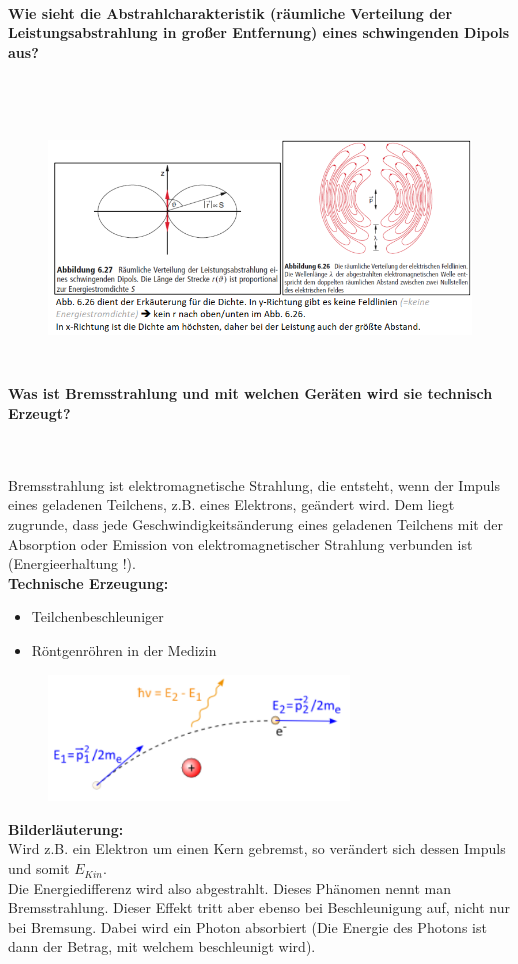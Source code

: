 \documentclass[a4paper, 11pt, ngerman, parskip=half-]{scrartcl}
\begin{document}
\paragraph{Wie sieht die Abstrahlcharakteristik (räumliche Verteilung der Leistungsabstrahlung in
    großer Entfernung) eines schwingenden Dipols aus?} ~
\begin{figure}[H]
    \centering
    \includegraphics[height=6.5cm]{image/12/5.png}
\end{figure}


\paragraph{Was ist Bremsstrahlung und mit welchen Geräten wird sie technisch Erzeugt?} ~

Bremsstrahlung ist elektromagnetische Strahlung, die entsteht, wenn der Impuls eines geladenen Teilchens, z.B. eines Elektrons, geändert wird. Dem liegt zugrunde, dass jede Geschwindigkeitsänderung eines geladenen Teilchens mit der Absorption oder Emission von elektromagnetischer Strahlung verbunden ist (Energieerhaltung !).\\
\textbf{Technische Erzeugung:} \\
\begin{itemize}
    \item Teilchenbeschleuniger
    \item Röntgenröhren in der Medizin
\end{itemize}
\begin{figure}[H]
    \centering
    \includegraphics[width=8cm]{image/12/6.png}
\end{figure}
\textbf{Bilderläuterung:} \\
Wird z.B. ein Elektron um einen Kern gebremst, so verändert sich dessen Impuls und somit $E_{Kin}$. \\
Die Energiedifferenz wird also abgestrahlt. Dieses Phänomen nennt man Bremsstrahlung. Dieser Effekt tritt aber ebenso bei Beschleunigung auf, nicht nur bei Bremsung. Dabei wird ein Photon absorbiert (Die Energie des Photons ist dann der Betrag, mit welchem beschleunigt wird).
\end{document}
